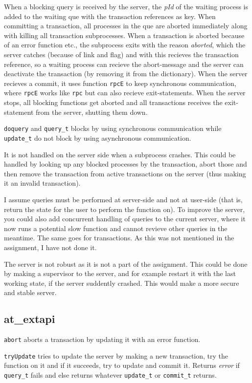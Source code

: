 \documentclass[a4paper, 10pt]{article}
\begin{document}
When a blocking query is received by the server, the \textit{pId} of the waiting process is added to the waiting que with the transaction references as key. When committing a transaction, all processes in the que are aborted immediately along with killing all transaction subprocesses. When a transaction is aborted because of an error function etc., the subprocess exits with the reason \textit{aborted}, which the server catches (because of link and flag) and with this recieves the transaction reference, so a waiting process can recieve the abort-message and the server can deactivate the transaction (by removing it from the dictionary).
When the server recieves a commit, it uses function \texttt{rpcE} to keep synchronous communication, where \texttt{rpcE} works like \texttt{rpc} but can also recieve exit-statements.
When the server stops, all blocking functions get aborted and all transactions receives the exit-statement from the server, shutting them down.

\texttt{doquery} and \texttt{query\_t} blocks by using synchronous communication while \texttt{update\_t} do not block by using asynchronous communication.

It is not handled on the server side when a subprocess crashes. This could be handled by looking up any blocked processes by the transaction, abort those and then remove the transaction from active transactions on the server (thus making it an invalid transaction).

I assume queries must be performed at server-side and not at user-side (that is, return the state for the user to perform the function on).
To improve the server, you could also add concurrent handling of queries to the current server, where it now runs a potential slow function and cannot revieve other queries in the meantime. The same goes for transactions. As this was not mentioned in the assignment, I have not done it.

The server is not robust as it is not a part of the assignment. This could be done by making a supervisor to the server, and for example restart it with the last working state, if the server suddently crashed. This would make a more secure and stable server.

\subsection{at\_extapi}
\texttt{abort} aborts a transaction by updating it with an error function.

\texttt{tryUpdate} tries to update the server by making a new transaction, try the function on it and if it succeeds, try to update and commit it. Returns \textit{error} if \texttt{query\_t} fails and else returns whatever \texttt{update\_t} or \texttt{commit\_t} returns.
\end{document}
